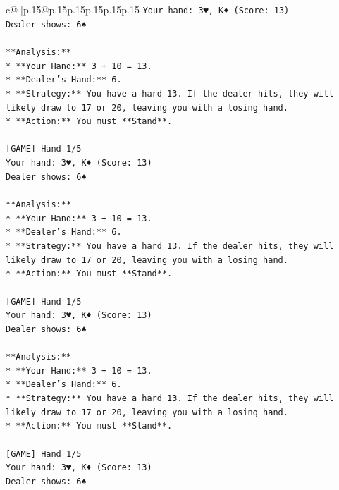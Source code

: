 \documentclass{article}
\begin{document}
{\begin{supertabular}{c@{$\;$}|p{.15\linewidth}@{}p{.15\linewidth}p{.15\linewidth}p{.15\linewidth}p{.15\linewidth}p{.15\linewidth}}
{{{\texttt{Your hand: 3♥, K♦ (Score: 13)} \\
\texttt{Dealer shows: 6♠} \\
\\ 
\texttt{**Analysis:**} \\
\texttt{*   **Your Hand:** 3 + 10 = 13.} \\
\texttt{*   **Dealer's Hand:** 6.} \\
\texttt{*   **Strategy:** You have a hard 13. If the dealer hits, they will likely draw to 17 or 20, leaving you with a losing hand.} \\
\texttt{*   **Action:** You must **Stand**.} \\
\\ 
\texttt{{[}GAME{]} Hand 1/5} \\
\texttt{Your hand: 3♥, K♦ (Score: 13)} \\
\texttt{Dealer shows: 6♠} \\
\\ 
\texttt{**Analysis:**} \\
\texttt{*   **Your Hand:** 3 + 10 = 13.} \\
\texttt{*   **Dealer's Hand:** 6.} \\
\texttt{*   **Strategy:** You have a hard 13. If the dealer hits, they will likely draw to 17 or 20, leaving you with a losing hand.} \\
\texttt{*   **Action:** You must **Stand**.} \\
\\ 
\texttt{{[}GAME{]} Hand 1/5} \\
\texttt{Your hand: 3♥, K♦ (Score: 13)} \\
\texttt{Dealer shows: 6♠} \\
\\ 
\texttt{**Analysis:**} \\
\texttt{*   **Your Hand:** 3 + 10 = 13.} \\
\texttt{*   **Dealer's Hand:** 6.} \\
\texttt{*   **Strategy:** You have a hard 13. If the dealer hits, they will likely draw to 17 or 20, leaving you with a losing hand.} \\
\texttt{*   **Action:** You must **Stand**.} \\
\\ 
\texttt{{[}GAME{]} Hand 1/5} \\
\texttt{Your hand: 3♥, K♦ (Score: 13)} \\
\texttt{Dealer shows: 6♠} \\
\\ 
}}}
\end{supertabular}}
\end{document}
